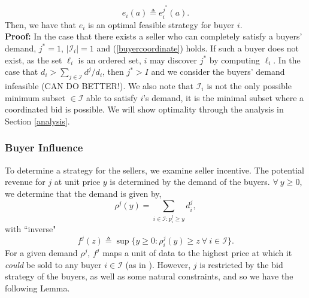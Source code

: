 \documentclass[12pt]{article}
\theoremstyle{definition}
\newcommand{\mcI}{\mathcal{I}}
\begin{document}
\begin{multicols}{2}
{\begin{equation}
    e_i(a) \triangleq e_i^{j^*}(a).
\end{equation}
Then, we have that $e_i$
is an optimal feasible strategy for buyer $i$.
}\\
\textbf{Proof:}
In the case that there exists a seller who can completely satisfy a buyers'
demand, $j^*=1$, $\vert \mcI_i\vert =1$ and (\ref{buyercoordinate}) holds. If such a buyer does not exist,
as the set $\ell_i$ is an ordered set, $i$ may discover 
$j^*$ by computing $\ell_i$. In the case that $d_i >
\sum_{j\in\mcI}d^j/d_i$, then $j^* > I$ and we consider the buyers' demand
infeasible (CAN DO BETTER!). 
We also note that $\mcI_i$ is not the only
possible minimum subset $\in\mcI$ able to satisfy $i$'s demand, it is the minimal subset where a
coordinated bid is possible. We will show optimality through the
analysis in Section \ref{analysis}.

\subsubsection{Buyer Influence}
To determine a strategy for the sellers, we examine seller incentive. The potential revenue for $j$ at unit price $y$ is determined by the
demand of the buyers. $\forall \ y\ge 0$, we determine that the demand is given by,
\begin{equation}\label{datademand}
    \rho^j(y) = \sum_{i\in\mcI : p_i^j\ge y} d_i^j, 
\end{equation}
with ``inverse"
\begin{equation}\label{revenue}
    f^j(z) \triangleq \sup\big\lbrace y\ge 0:
        \rho_i^j(y) \ge z \ \forall \ i \in \mcI\big\rbrace.
\end{equation}
For a given demand $\rho^j$, $f^j$ maps a unit of data to the highest price at
which it \emph{could} be sold to any buyer $i\in \mcI$ (as in \cite{semret}). However, $j$ is restricted by
the bid strategy of the buyers, as well as some natural constraints, and so we have the following Lemma.


\end{multicols}
\end{document}

